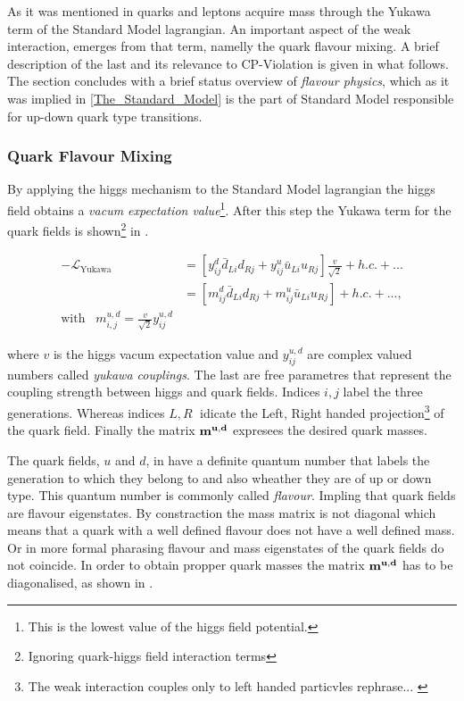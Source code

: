 As it was mentioned in  quarks and leptons acquire mass through the Yukawa term
of the Standard Model lagrangian. An important aspect of the weak interaction, emerges from that term,
namelly the quark flavour mixing. A brief description of the last and its relevance to CP-Violation is given in what follows.
The section concludes with a brief status overview of {\it flavour physics}, which as it was implied in \ref{The_Standard_Model}
is the part of Standard Model responsible for up-down quark type transitions.

\subsubsection{Quark Flavour Mixing}
By applying the higgs mechanism to the Standard Model lagrangian the higgs field obtains a
{\it vacum expectation value}\footnote{This is the lowest value of the higgs field potential.}.
After this step the Yukawa term for the quark fields is shown\footnote{Ignoring quark-higgs field interaction terms} in .

\begin{subequations}
\label{yukawa_flavour}
  \begin{align}
  -\mathscr{L}_{\text{Yukawa}} &= \left[ y_{ij}^d \bar{d}_{Li} d_{Rj} + y_{ij}^u \bar{u}_{Li} u_{Rj} \right] \frac{v}{\sqrt{2}} + h.c. + ...  \\
                               &= \left[ m_{ij}^d \bar{d}_{Li} d_{Rj} + m_{ij}^u \bar{u}_{Li} u_{Rj} \right] + h.c. + ...,  \\
                               \text{with} \;\;\; m^{u,d}_{i,j} = \frac{v}{\sqrt{2}} y_{ij}^{u,d} & \nonumber
  \end{align}
\end{subequations}

\noindent where $v$ is the higgs vacum expectation value and $y_{ij}^{u,d}$ are complex valued numbers called {\it yukawa couplings}.
The last are free parametres that represent the coupling strength between higgs and quark fields.
Indices $i,j$ label the three generations. Whereas indices $L,R\;$ idicate the Left, Right handed
projection\footnote{The weak interaction couples only to left handed particvles {\color{red} rephrase... }} of the quark field.
Finally the matrix $\bf m^{u,d}$ expresees the desired quark masses.

The quark fields, $u$ and $d$,  in  have a definite quantum number that labels the generation to which they belong
to and also wheather they are of up or down type. This quantum number is commonly called {\it flavour}. Impling that quark fields
are flavour eigenstates. By constraction the mass matrix is not diagonal which means that
a quark with a well defined flavour does not have a well defined mass. Or in more formal pharasing flavour and mass eigenstates of
the quark fields do not coincide. In order to obtain propper quark masses the matrix $\bf m^{u,d}$ has to be diagonalised, as shown in .

